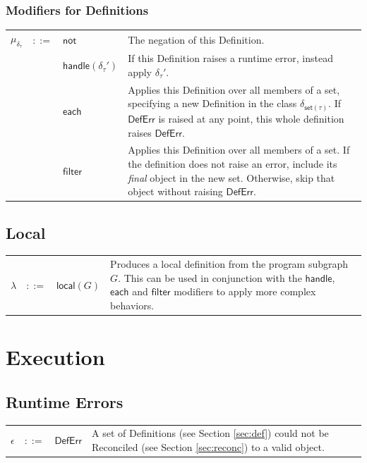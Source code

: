 \documentclass[twoside,11pt]{report}
\begin{document}
\subsection{Modifiers for Definitions}
\label{subsec:mods-defs}

\begin{tabularx}{\textwidth}{l l l X}
$\mu_{\delta_\tau}$ & $::=$ & $\mathsf{not}$ & The negation of this Definition. \\
 & & $\mathsf{handle}(\delta_\tau')$ & If this Definition raises a runtime error, instead apply $\delta_\tau'$. \\
 & & $\mathsf{each}$ & Applies this Definition over all members of a set, specifying a new Definition in the class $\delta_{\mathsf{set}(\tau)}$. If $\mathsf{DefErr}$ is raised at any point, this whole definition raises $\mathsf{DefErr}$. \\
 & & $\mathsf{filter}$ & Applies this Definition over all members of a set. If the definition does not raise an error, include its {\it final} object in the new set. Otherwise, skip that object without raising $\mathsf{DefErr}$. \\
\end{tabularx}

\section{Local}
\label{sec:local}
\begin{tabularx}{\textwidth}{l l l X}
$\lambda$ & $::=$ & $\mathsf{local}(G)$ & Produces a local definition from the program subgraph $G$. This can be used in conjunction with the $\mathsf{handle}$, $\mathsf{each}$ and $\mathsf{filter}$ modifiers to apply more complex behaviors.\\
\end{tabularx}


\chapter{Execution}
\label{chap:exec}

\section{Runtime Errors}
\label{sec:runtime-errors}

\begin{tabularx}{\textwidth}{l l l X}
$\epsilon$ & $::=$ & $\mathsf{DefErr}$ & A set of Definitions (see Section \ref{sec:def}) could not be Reconciled (see Section \ref{sec:reconc}) to a valid object.
\end{tabularx}
\end{document}
